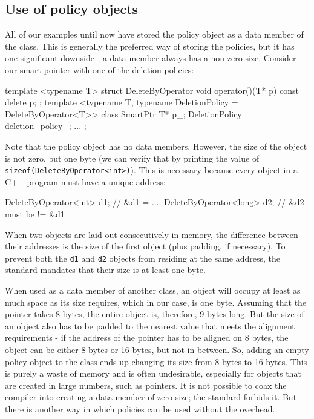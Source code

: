 \subsection{Use of policy objects}

All of our examples until now have stored the policy object as a data member of the class. This is generally the preferred way of storing the policies, but it has one significant downside - a data member always has a non-zero size. Consider our smart pointer with one of the deletion policies:

\begin{code}
template <typename T> struct DeleteByOperator {
  void operator()(T* p) const {
    delete p;
  }
};
template <typename T,
          typename DeletionPolicy = DeleteByOperator<T>>
class SmartPtr {
  T* p_;
  DeletionPolicy deletion_policy_;
  ...
};
\end{code}

Note that the policy object has no data members. However, the size of the object is not zero, but one byte (we can verify that by printing the value of \texttt{sizeof(DeleteByOperator\textless{}int\textgreater{})}). This is necessary because every object in a C++ program must have a unique address:

\begin{code}
DeleteByOperator<int> d1;     // &d1 = ....
DeleteByOperator<long> d2; // &d2 must be != &d1
\end{code}

When two objects are laid out consecutively in memory, the difference between their addresses is the size of the first object (plus padding, if necessary). To prevent both the \texttt{d1} and \texttt{d2} objects from residing at the same address, the standard mandates that their size is at least one byte.

When used as a data member of another class, an object will occupy at least as much space as its size requires, which in our case, is one byte. Assuming that the pointer takes 8 bytes, the entire object is, therefore, 9 bytes long. But the size of an object also has to be padded to the nearest value that meets the alignment requirements - if the address of the pointer has to be aligned on 8 bytes, the object can be either 8 bytes or 16 bytes, but not in-between. So, adding an empty policy object to the class ends up changing its size from 8 bytes to 16 bytes. This is purely a waste of memory and is often undesirable, especially for objects that are created in large numbers, such as pointers. It is not possible to coax the compiler into creating a data member of zero size; the standard forbids it. But there is another way in which policies can be used without the overhead.

